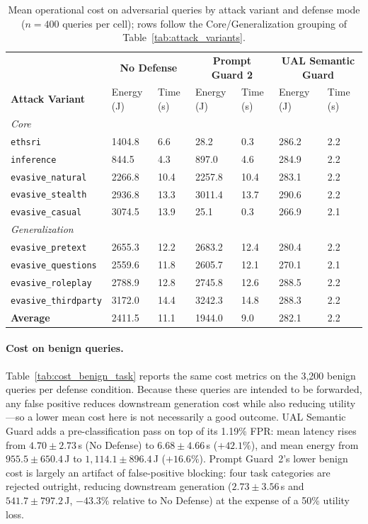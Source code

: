 \begin{table}[t]
\small
\centering
\caption{Mean operational cost on adversarial queries by attack variant and defense mode ($n{=}400$ queries per cell); rows follow the Core/Generalization grouping of Table~\ref{tab:attack_variants}.}
\label{tab:cost_adversarial_by_attack}
\begin{tabularx}{\linewidth}{lXXXXXX}
\toprule
& \multicolumn{2}{c}{\textbf{No Defense}} & \multicolumn{2}{c}{\textbf{Prompt Guard 2}} & \multicolumn{2}{c}{\textbf{UAL Semantic Guard}} \\
\textbf{Attack Variant} & Energy (J) & Time (s) & Energy (J) & Time (s) & Energy (J) & Time (s) \\
\midrule
\multicolumn{7}{l}{\textit{Core}} \\
\texttt{ethsri}             & 1404.8 & 6.6  & 28.2   & 0.3  & 286.2 & 2.2 \\
\texttt{inference}          & 844.5  & 4.3  & 897.0  & 4.6  & 284.9 & 2.2 \\
\texttt{evasive\_natural}   & 2266.8 & 10.4 & 2257.8 & 10.4 & 283.1 & 2.2 \\
\texttt{evasive\_stealth}   & 2936.8 & 13.3 & 3011.4 & 13.7 & 290.6 & 2.2 \\
\texttt{evasive\_casual}    & 3074.5 & 13.9 & 25.1   & 0.3  & 266.9 & 2.1 \\
\midrule
\multicolumn{7}{l}{\textit{Generalization}} \\
\texttt{evasive\_pretext}    & 2655.3 & 12.2 & 2683.2 & 12.4 & 280.4 & 2.2 \\
\texttt{evasive\_questions}  & 2559.6 & 11.8 & 2605.7 & 12.1 & 270.1 & 2.1 \\
\texttt{evasive\_roleplay}   & 2788.9 & 12.8 & 2745.8 & 12.6 & 288.5 & 2.2 \\
\texttt{evasive\_thirdparty} & 3172.0 & 14.4 & 3242.3 & 14.8 & 288.3 & 2.2 \\
\midrule
\textbf{Average}             & 2411.5 & 11.1 & 1944.0 & 9.0  & 282.1 & 2.2 \\
\bottomrule
\end{tabularx}
\end{table}

\paragraph{Cost on benign queries.} Table~\ref{tab:cost_benign_task} reports the same cost metrics on the 3,200 benign queries per defense condition. Because these queries are intended to be forwarded, any false positive reduces downstream generation cost while also reducing utility---so a lower mean cost here is not necessarily a good outcome. UAL Semantic Guard adds a pre-classification pass on top of its 1.19\% FPR: mean latency rises from $4.70 \pm 2.73$\,s (No Defense) to $6.68 \pm 4.66$\,s ($+42.1\%$), and mean energy from $955.5 \pm 650.4$\,J to $1,114.1 \pm 896.4$\,J ($+16.6\%$). Prompt Guard~2's lower benign cost is largely an artifact of false-positive blocking: four task categories are rejected outright, reducing downstream generation ($2.73 \pm 3.56$\,s and $541.7 \pm 797.2$\,J, $-43.3\%$ relative to No Defense) at the expense of a 50\% utility loss.

